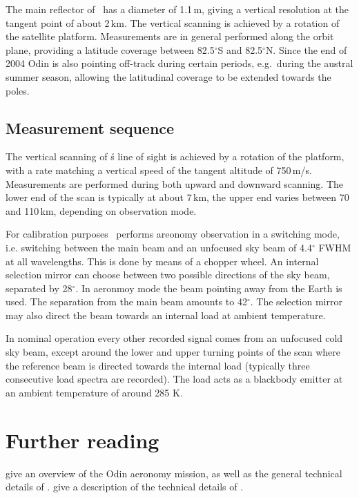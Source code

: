The main reflector of \smr\ has a diameter of 1.1\,m, giving a
vertical resolution at the tangent point of about 2\,km. 
The vertical scanning is achieved by a rotation of the satellite
platform. Measurements are in general performed along the orbit plane, providing a
latitude coverage between 82.5$^{\circ}$S and 82.5$^{\circ}$N. Since the end of
2004 Odin is also pointing off-track during certain periods, e.g.\ during the
austral summer season, allowing the latitudinal coverage to be extended towards
the poles. 




\subsection{Measurement sequence}


The vertical scanning of \smr\'s line of sight is achieved by a
rotation of the platform, with a rate matching a vertical speed of
the tangent altitude of 750\,m/s. Measurements are performed during
both upward and downward scanning. The lower end of the scan is typically
at about 7\,km, the upper end varies between 70 and 110\,km, depending on
observation mode.

For calibration purposes \smr\ performs areonomy observation
in a switching mode, i.e. switching between the main beam and
an unfocused sky beam of 4.4$^{\circ}$ FWHM at all wavelengths. This is done
by means of a chopper wheel. An internal selection mirror
can choose between two possible directions of the sky beam,
separated by 28$^{\circ}$. In aeronmoy mode the beam pointing
away from the Earth is used. The separation from the main beam
amounts to 42$^{\circ}$.
The selection mirror may also direct the beam towards an internal
load at ambient temperature.

In nominal operation every other recorded signal comes from an
unfocused cold sky beam, except around the lower and upper turning
points of the scan where the reference beam is directed towards
the internal load (typically three consecutive load spectra are recorded).
The load acts as a blackbody emitter at
an ambient temperature of around 285 K.



\section{Further reading}
\label{sec:reading}

\citet{murtagh:anove:02} give an overview of the Odin aeronomy mission, as well
as the general technical details of \smr. \citet{frisk:theod:03} give a description
of the technical details of \smr.


